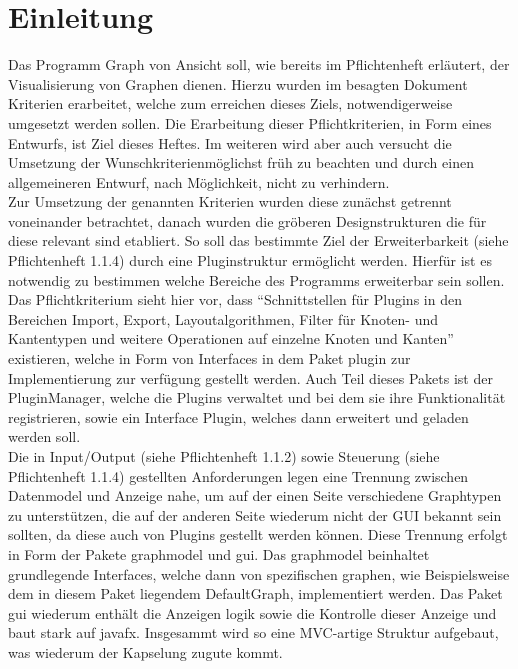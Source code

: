\chapter{Einleitung}
\label{ch:einleitung}

Das Programm Graph von Ansicht soll, wie bereits im Pflichtenheft erläutert, der Visualisierung von Graphen dienen. Hierzu wurden im besagten Dokument Kriterien erarbeitet, welche zum erreichen dieses Ziels, notwendigerweise umgesetzt werden sollen. Die Erarbeitung dieser Pflichtkriterien, in Form eines Entwurfs, ist Ziel dieses Heftes. Im weiteren wird aber auch versucht die Umsetzung der Wunschkriterienmöglichst früh zu beachten und durch einen allgemeineren Entwurf, nach Möglichkeit, nicht zu verhindern. \\
Zur Umsetzung der genannten Kriterien wurden diese zunächst getrennt voneinander betrachtet, danach wurden die gröberen Designstrukturen die für diese relevant sind etabliert. So soll das bestimmte Ziel der Erweiterbarkeit (siehe Pflichtenheft 1.1.4) durch eine Pluginstruktur ermöglicht werden. Hierfür ist es notwendig zu bestimmen welche Bereiche des Programms erweiterbar sein sollen. Das Pflichtkriterium sieht hier vor, dass "`Schnittstellen für Plugins in den Bereichen Import, Export, Layoutalgorithmen, Filter für Knoten- und Kantentypen und weitere Operationen auf einzelne Knoten und Kanten"' existieren, welche in Form von Interfaces in dem Paket plugin zur Implementierung zur verfügung gestellt werden. Auch Teil dieses Pakets ist der PluginManager, welche die Plugins verwaltet und bei dem sie ihre Funktionalität registrieren, sowie ein Interface Plugin, welches dann erweitert und geladen werden soll.\\
Die in Input/Output (siehe Pflichtenheft 1.1.2) sowie Steuerung (siehe Pflichtenheft 1.1.4) gestellten Anforderungen legen eine Trennung zwischen Datenmodel und Anzeige nahe, um auf der einen Seite verschiedene Graphtypen zu unterstützen, die auf der anderen Seite wiederum nicht der GUI bekannt sein sollten, da diese auch von Plugins gestellt werden können. Diese Trennung erfolgt in Form der Pakete graphmodel und gui. Das graphmodel beinhaltet grundlegende Interfaces, welche dann von spezifischen graphen, wie Beispielsweise dem in diesem Paket liegendem DefaultGraph, implementiert werden. Das Paket gui wiederum enthält die Anzeigen logik sowie die Kontrolle dieser Anzeige und baut stark auf javafx. Insgesammt wird so eine MVC-artige Struktur aufgebaut, was wiederum der Kapselung zugute kommt.\\
